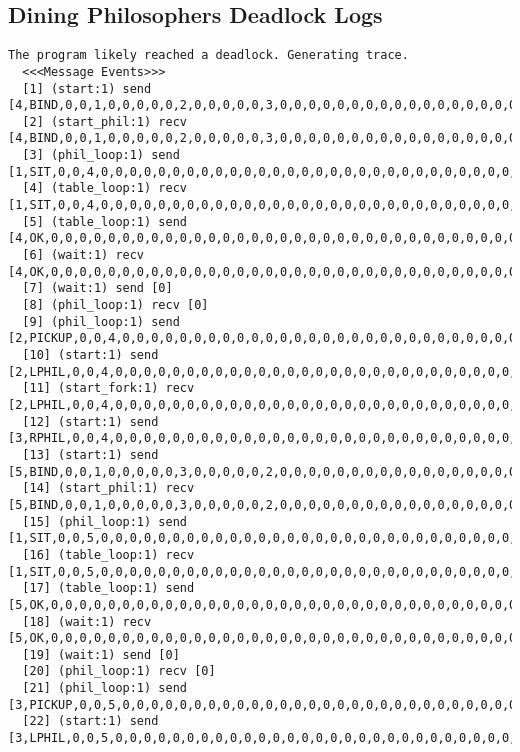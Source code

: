 \subsection{Dining Philosophers Deadlock Logs}
\begin{lstlisting}[xleftmargin=.01\linewidth, xrightmargin=0.01\linewidth, caption={Dining Philosophers Verlixir Report.}, label={lst:dp_bug}]
  The program likely reached a deadlock. Generating trace.
  <<<Message Events>>>
  [1] (start:1) send [4,BIND,0,0,1,0,0,0,0,0,2,0,0,0,0,0,3,0,0,0,0,0,0,0,0,0,0,0,0,0,0,0,0,0,0,0,0,0,0,0,0,0,0,0]
  [2] (start_phil:1) recv [4,BIND,0,0,1,0,0,0,0,0,2,0,0,0,0,0,3,0,0,0,0,0,0,0,0,0,0,0,0,0,0,0,0,0,0,0,0,0,0,0,0,0,0,0]
  [3] (phil_loop:1) send [1,SIT,0,0,4,0,0,0,0,0,0,0,0,0,0,0,0,0,0,0,0,0,0,0,0,0,0,0,0,0,0,0,0,0,0,0,0,0,0,0,0,0,0,0]
  [4] (table_loop:1) recv [1,SIT,0,0,4,0,0,0,0,0,0,0,0,0,0,0,0,0,0,0,0,0,0,0,0,0,0,0,0,0,0,0,0,0,0,0,0,0,0,0,0,0,0,0]
  [5] (table_loop:1) send [4,OK,0,0,0,0,0,0,0,0,0,0,0,0,0,0,0,0,0,0,0,0,0,0,0,0,0,0,0,0,0,0,0,0,0,0,0,0,0,0,0,0,0,0]
  [6] (wait:1) recv [4,OK,0,0,0,0,0,0,0,0,0,0,0,0,0,0,0,0,0,0,0,0,0,0,0,0,0,0,0,0,0,0,0,0,0,0,0,0,0,0,0,0,0,0]
  [7] (wait:1) send [0]
  [8] (phil_loop:1) recv [0]
  [9] (phil_loop:1) send [2,PICKUP,0,0,4,0,0,0,0,0,0,0,0,0,0,0,0,0,0,0,0,0,0,0,0,0,0,0,0,0,0,0,0,0,0,0,0,0,0,0,0,0,0,0]
  [10] (start:1) send [2,LPHIL,0,0,4,0,0,0,0,0,0,0,0,0,0,0,0,0,0,0,0,0,0,0,0,0,0,0,0,0,0,0,0,0,0,0,0,0,0,0,0,0,0,0]
  [11] (start_fork:1) recv [2,LPHIL,0,0,4,0,0,0,0,0,0,0,0,0,0,0,0,0,0,0,0,0,0,0,0,0,0,0,0,0,0,0,0,0,0,0,0,0,0,0,0,0,0,0]
  [12] (start:1) send [3,RPHIL,0,0,4,0,0,0,0,0,0,0,0,0,0,0,0,0,0,0,0,0,0,0,0,0,0,0,0,0,0,0,0,0,0,0,0,0,0,0,0,0,0,0]
  [13] (start:1) send [5,BIND,0,0,1,0,0,0,0,0,3,0,0,0,0,0,2,0,0,0,0,0,0,0,0,0,0,0,0,0,0,0,0,0,0,0,0,0,0,0,0,0,0,0]
  [14] (start_phil:1) recv [5,BIND,0,0,1,0,0,0,0,0,3,0,0,0,0,0,2,0,0,0,0,0,0,0,0,0,0,0,0,0,0,0,0,0,0,0,0,0,0,0,0,0,0,0]
  [15] (phil_loop:1) send [1,SIT,0,0,5,0,0,0,0,0,0,0,0,0,0,0,0,0,0,0,0,0,0,0,0,0,0,0,0,0,0,0,0,0,0,0,0,0,0,0,0,0,0,0]
  [16] (table_loop:1) recv [1,SIT,0,0,5,0,0,0,0,0,0,0,0,0,0,0,0,0,0,0,0,0,0,0,0,0,0,0,0,0,0,0,0,0,0,0,0,0,0,0,0,0,0,0]
  [17] (table_loop:1) send [5,OK,0,0,0,0,0,0,0,0,0,0,0,0,0,0,0,0,0,0,0,0,0,0,0,0,0,0,0,0,0,0,0,0,0,0,0,0,0,0,0,0,0,0]
  [18] (wait:1) recv [5,OK,0,0,0,0,0,0,0,0,0,0,0,0,0,0,0,0,0,0,0,0,0,0,0,0,0,0,0,0,0,0,0,0,0,0,0,0,0,0,0,0,0,0]
  [19] (wait:1) send [0]
  [20] (phil_loop:1) recv [0]
  [21] (phil_loop:1) send [3,PICKUP,0,0,5,0,0,0,0,0,0,0,0,0,0,0,0,0,0,0,0,0,0,0,0,0,0,0,0,0,0,0,0,0,0,0,0,0,0,0,0,0,0,0]
  [22] (start:1) send [3,LPHIL,0,0,5,0,0,0,0,0,0,0,0,0,0,0,0,0,0,0,0,0,0,0,0,0,0,0,0,0,0,0,0,0,0,0,0,0,0,0,0,0,0,0]

\end{lstlisting}
